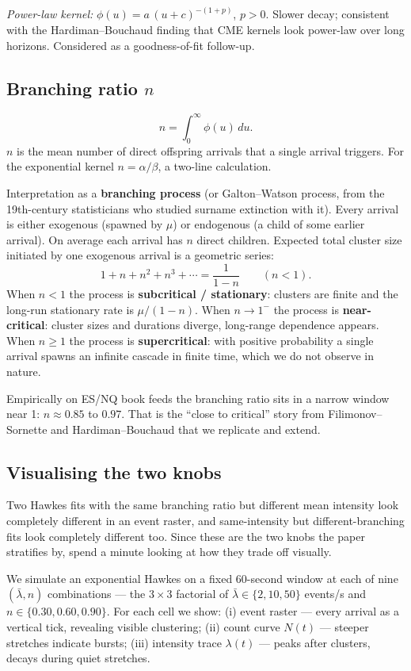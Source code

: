\emph{Power-law kernel:} $\phi(u) = a\,(u + c)^{-(1+p)}$, $p > 0$. Slower decay; consistent with the Hardiman--Bouchaud finding that CME kernels look power-law over long horizons. Considered as a goodness-of-fit follow-up.

\subsection{Branching ratio $n$}
\label{app:pp-branching}

$$n = \int_0^\infty \phi(u)\, du.$$
$n$ is the mean number of direct offspring arrivals that a single arrival triggers. For the exponential kernel $n = \alpha/\beta$, a two-line calculation.

Interpretation as a \textbf{branching process} (or Galton--Watson process, from the 19th-century statisticians who studied surname extinction with it). Every arrival is either exogenous (spawned by $\mu$) or endogenous (a child of some earlier arrival). On average each arrival has $n$ direct children. Expected total cluster size initiated by one exogenous arrival is a geometric series:
$$1 + n + n^2 + n^3 + \cdots = \frac{1}{1 - n} \qquad (n < 1).$$
When $n < 1$ the process is \textbf{subcritical / stationary}: clusters are finite and the long-run stationary rate is $\mu / (1 - n)$. When $n \to 1^-$ the process is \textbf{near-critical}: cluster sizes and durations diverge, long-range dependence appears. When $n \geq 1$ the process is \textbf{supercritical}: with positive probability a single arrival spawns an infinite cascade in finite time, which we do not observe in nature.

Empirically on ES/NQ book feeds the branching ratio sits in a narrow window near 1: $n \approx 0.85$ to $0.97$. That is the ``close to critical'' story from Filimonov--Sornette and Hardiman--Bouchaud that we replicate and extend.

\subsection{Visualising the two knobs}
\label{app:pp-visualise}

Two Hawkes fits with the same branching ratio but different mean intensity look completely different in an event raster, and same-intensity but different-branching fits look completely different too. Since these are the two knobs the paper stratifies by, spend a minute looking at how they trade off visually.

We simulate an exponential Hawkes on a fixed 60-second window at each of nine $(\bar\lambda, n)$ combinations --- the $3\times 3$ factorial of $\bar\lambda \in \{2, 10, 50\}$ events/s and $n \in \{0.30, 0.60, 0.90\}$. For each cell we show: (i) event raster --- every arrival as a vertical tick, revealing visible clustering; (ii) count curve $N(t)$ --- steeper stretches indicate bursts; (iii) intensity trace $\lambda(t)$ --- peaks after clusters, decays during quiet stretches.

